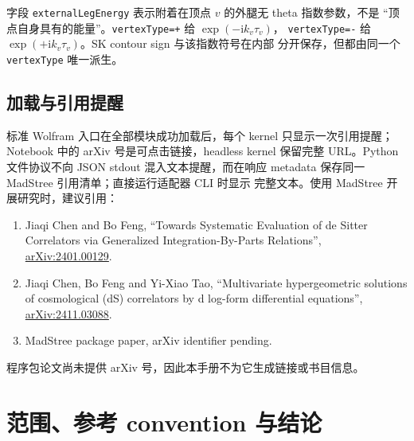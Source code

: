 \documentclass[11pt,a4paper]{ctexart}
\newcommand{\ii}{\mathrm i}
\begin{document}
字段 \texttt{externalLegEnergy} 表示附着在顶点 $v$ 的外腿无 theta 指数参数，不是
“顶点自身具有的能量”。\texttt{vertexType=+} 给 $\exp(-\ii k_v\tau_v)$，
\texttt{vertexType=-} 给 $\exp(+\ii k_v\tau_v)$。SK contour sign 与该指数符号在内部
分开保存，但都由同一个 \texttt{vertexType} 唯一派生。

\subsection{加载与引用提醒}

标准 Wolfram 入口在全部模块成功加载后，每个 kernel 只显示一次引用提醒；Notebook 中的
arXiv 号是可点击链接，headless kernel 保留完整 URL。Python 文件协议不向 JSON stdout
混入文本提醒，而在响应 metadata 保存同一 MadStree 引用清单；直接运行适配器 CLI 时显示
完整文本。使用 MadStree 开展研究时，建议引用：
\begin{enumerate}
  \item Jiaqi Chen and Bo Feng, ``Towards Systematic Evaluation of de Sitter Correlators via Generalized Integration-By-Parts Relations'', \href{https://arxiv.org/abs/2401.00129}{arXiv:2401.00129}.
  \item Jiaqi Chen, Bo Feng and Yi-Xiao Tao, ``Multivariate hypergeometric solutions of cosmological (dS) correlators by d log-form differential equations'', \href{https://arxiv.org/abs/2411.03088}{arXiv:2411.03088}.
  \item MadStree package paper, arXiv identifier pending.
\end{enumerate}
程序包论文尚未提供 arXiv 号，因此本手册不为它生成链接或书目信息。

\section{范围、参考 convention 与结论}
\end{document}
